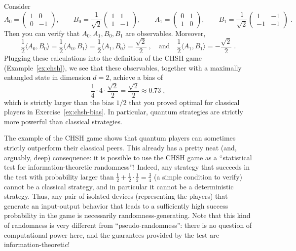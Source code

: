 \begin{example}\label{ex:chsh-qbias}
Consider 
\begin{equation*}
A_0=\left(\begin{array}{cc}1&0\\0&-1\end{array}\right),\qquad
B_0=\frac{1}{\sqrt{2}}\left(\begin{array}{cc}1&1\\1&-1\end{array}\right),\qquad
A_1=\left(\begin{array}{cc}0&1\\1&0\end{array}\right),\qquad
B_1=\frac{1}{\sqrt{2}}\left(\begin{array}{cc}1&-1\\-1&-1\end{array}\right)\;.
\end{equation*}
Then you can verify that $A_0,A_1,B_0,B_1$ are observables. Moreover, 
$$\frac{1}{2} \langle A_0, B_0\rangle = \frac{1}{2}\langle A_0, B_1\rangle = \frac{1}{2} \langle A_1, B_0\rangle =\frac{\sqrt{2}}{2}\;,\quad\text{and}\quad \frac{1}{2}\langle  A_1,B_1\rangle = -\frac{\sqrt{2}}{2}\;.$$
 Plugging these calculations into the definition of the CHSH game (Example~\ref{ex:chsh}), we see that these observables, together with a maximally entangled state in dimension $d=2$, achieve a bias of
$$
\frac{1}{4}\cdot 4\cdot \frac{\sqrt{2}}{2} =\frac{\sqrt{2}}{2} \approx 0.73\;,
$$
which is strictly larger than the bias $1/2$ that you proved optimal for classical players in Exercise~\ref{ex:chsh-bias}. In particular, quantum strategies are strictly more powerful than classical strategies.
\end{example}

The example of the CHSH game shows that quantum players can sometimes strictly outperform their classical peers. This already has a pretty neat (and, arguably, deep) consequence: it is possible to use the CHSH game as a ``statistical test for information-theoretic randomness''! Indeed, any strategy that succeeds in the test  with probability larger than $\frac{1}{2} + \frac{1}{2}\cdot\frac{1}{2}=\frac{3}{4}$ (a simple condition to verify) cannot be a classical strategy, and in particular it cannot be a deterministic strategy. Thus, any pair of isolated devices (representing the players) that generate an input-output behavior that leads to a sufficiently high success probability in the game is necessarily randomness-generating. Note that this kind of randomness is very different from ``pseudo-randomness'': there is no question of computational power here, and the guarantees provided by the test are information-theoretic!

